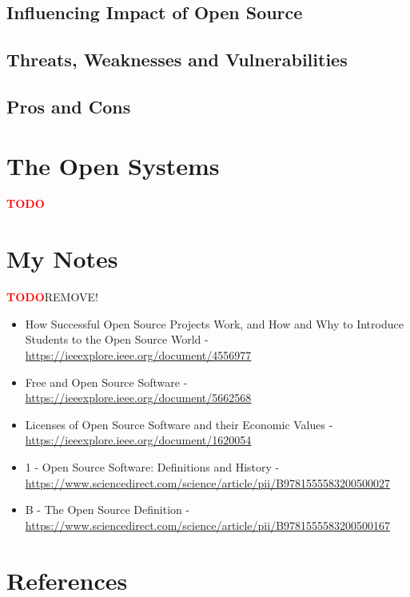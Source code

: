 \documentclass[11pt,a4paper]{article}
\newcommand{\TODO}{\textbf{\textcolor{red}{TODO}}} %
\theoremstyle{definition}
\begin{document}
    \subsection{Influencing Impact of Open Source}

    \subsection{Threats, Weaknesses and Vulnerabilities}

    \subsection{Pros and Cons}

\section{The Open Systems}

    \TODO

\section{My Notes}

    \TODO REMOVE!

    \begin{itemize}
      \item How Successful Open Source Projects Work, and How and Why to Introduce Students to the Open Source World - \url{https://ieeexplore.ieee.org/document/4556977}
      \item Free and Open Source Software - \url{https://ieeexplore.ieee.org/document/5662568}
      \item Licenses of Open Source Software and their Economic Values - \url{https://ieeexplore.ieee.org/document/1620054}
      \item 1 - Open Source Software: Definitions and History - \url{https://www.sciencedirect.com/science/article/pii/B9781555583200500027}
      \item B - The Open Source Definition - \url{https://www.sciencedirect.com/science/article/pii/B9781555583200500167}
    \end{itemize}

\newpage

\section{References}

\begin{flushleft}
    
\end{flushleft}
\end{document}
